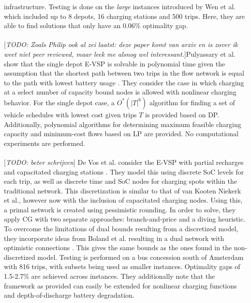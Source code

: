 \documentclass[]{book}
\newcommand{\todo}[1]{{\color{red}[\textit{TODO: #1}]}}
\begin{document}
infrastructure. Testing is done on the \textit{large}
instances introduced by Wen et al. \cite{Wen2016} which included up to 8
depots, 16 charging stations and 500 trips. Here, they are able to find
solutions that only have an 0.06\% optimality gap. \\\\
\todo{Zoals Philip ook al zei laatst: deze paper komt van arxiv en is zover ik weet niet peer reviewed, maar leek me alsnog wel interessant.}Pulyassary et al. show that the single depot E-VSP is solvable in polynomial time given the
assumption that the shortest path between two trips in the flow network is
equal to the path with lowest battery usage \cite{Pulyassary2024}. They
consider the case in which charging at a select number of capacity bound nodes
is allowed with nonlinear charging behavior. For the single depot case, a
$O^*(|T|^6)$ algorithm for finding a set of vehicle schedules with lowest cost
given trips $T$ is provided based on DP. Additionally, polynomial algorithms
for determining maximum feasible charging capacity and minimum-cost flows based
on LP are provided. No computational experiments are performed. \\\\

\todo{beter schrijven}
De Vos et al. consider the E-VSP with partial recharges and capacitated charging stations \cite{deVos2024}. 
They model this using discrete SoC levels for each trip, as well as discrete time and SoC nodes for charging spots within the traditional network. This discretization is similar to that of van Kooten Niekerk et al., however now with the inclusion of capacitated charging nodes. Using this, a primal network is created using pessimistic
rounding. In order to solve, they apply CG with two separate approaches:
branch-and-price and a diving heuristic. To overcome the limitations of dual
bounds resulting from a discretized model, they incorporate ideas from Boland
et al. resulting in a dual network with optimistic connections
\cite{Boland2017}. This gives the same bounds as the ones found in the
non-discretized model. Testing is performed on a bus concession south of
Amsterdam with 816 trips, with subsets being used as smaller instances.
Optimality gaps of 1.5-2.7\% are achieved across instances. They additionally
note that the framework as provided can easily be extended for nonlinear
charging functions and depth-of-discharge battery degradation. \\\\
\end{document}
